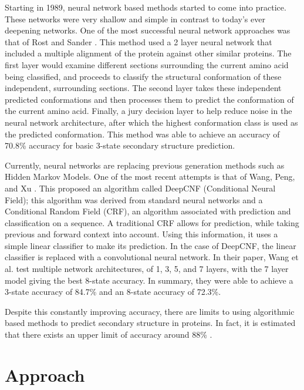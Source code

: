 \documentclass[pageno]{jpaper}
\begin{document}
\par
Starting in 1989, neural network based methods started to come into practice.  These networks were very shallow and simple in contrast to today's ever deepening networks.  One of the most successful neural network approaches was that of Rost and Sander \cite{rost:1993}.  This method used a 2 layer neural network that included a multiple alignment of the protein against other similar proteins.  The first layer would examine different sections surrounding the current amino acid being classified, and proceeds to classify the structural conformation of these independent, surrounding sections.  The second layer takes these independent predicted conformations and then processes them to predict the conformation of the current amino acid.  Finally, a jury decision layer to help reduce noise in the neural network architecture, after which the highest conformation class is used as the predicted conformation.  This method was able to achieve an accuracy of 70.8\% accuracy for basic 3-state secondary structure prediction.

\par
Currently, neural networks are replacing previous generation methods such as Hidden Markov Models.  One of the most recent attempts is that of Wang, Peng, and Xu \cite{wang:2016}.  This proposed an algorithm called DeepCNF (Conditional Neural Field); this algorithm was derived from standard neural networks and a Conditional Random Field (CRF), an algorithm associated with prediction and classification on a sequence.  A traditional CRF allows for prediction, while taking previous and forward context into account.  Using this information, it uses a simple linear classifier to make its prediction.  In the case of DeepCNF, the linear classifier is replaced with a convolutional neural network.  In their paper, Wang et al. test multiple network architectures, of 1, 3, 5, and 7 layers, with the 7 layer model giving the best 8-state accuracy.  In summary, they were able to achieve a 3-state accuracy of 84.7\% and an 8-state accuracy of 72.3\%.

\par
Despite this constantly improving accuracy, there are limits to using algorithmic based methods to predict secondary structure in proteins.  In fact, it is estimated that there exists an upper limit of accuracy around 88\% \cite{rost:2001}.


\section{Approach}
\end{document}
